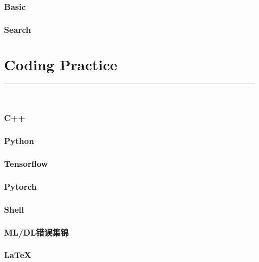 \documentclass{article}
\begin{document}
\section{Basic}

\section{Search}



\clearpage
\part{Coding Practice}
{\noindent}	 \rule[-10pt]{17.5cm}{0.5em}\\

\section{C++}


\section{Python}


\section{Tensorflow}


\section{Pytorch}


\section{Shell}


\section{ML/DL错误集锦}

%
\section{\LaTeX}

\end{document}
